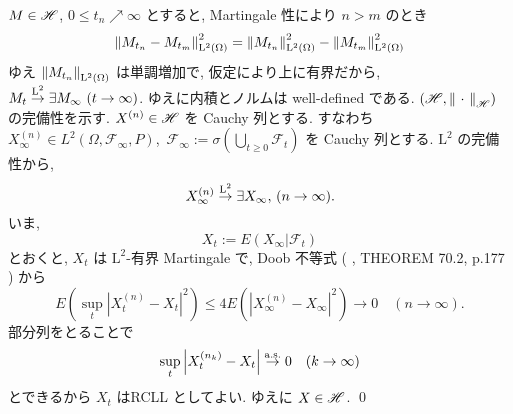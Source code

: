 \documentclass{ltjsarticle}
\begin{document}
\begin{prf}
	\( M \in \mathscr{H} \), \( 0 \le t_n \nearrow \infty \) とすると, Martingale 性により \( n > m \) のとき
	\[
		\left\|  M_{t_n} - M_{t_m}  \right\|_{\mathrm{L}^2(\Omega)}^2 = \left\|  M_{t_n}  \right\|_{\mathrm{L}^2(\Omega)}^2 - \left\|  M_{t_m}  \right\|_{\mathrm{L}^2(\Omega)}^2
	\]
	ゆえ \( \left\|  M_{t_n}  \right\|_{\mathrm{L}^2(\Omega)} \) は単調増加で, 仮定により上に有界だから,
	\( M_t \stackrel{ \mathrm{L}^2 }{ \to } \exists M_{\infty} \ (t \to \infty) \).
	ゆえに内積とノルムは well-defined である.
	\( \left( \mathscr{H}, \left\| \ \cdot \  \right\|_{\mathscr{H}} \right) \) の完備性を示す.
	\( X^{ ( n ) } \in \mathscr{H} \) を Cauchy 列とする.
	すなわち
	\( X^{ ( n ) }_{\infty} \in L^2( \Omega, \mathscr{F}_{\infty}, P ) \),\,
	\( \mathscr{F}_{\infty} := \sigma \left( \bigcup_{ t \ge 0} \mathscr{F}_t \right) \)
	を Cauchy 列とする.
	\( \mathrm{L}^2 \) の完備性から,
	\[
		X^{ ( n ) }_{\infty} \stackrel{ \mathrm{L}^2 }{ \to } \exists X_{\infty},\,( n \to \infty ).
	\]
	いま,
	\[
		X_t := E \left( X_{\infty} | \mathscr{F}_t \right)
	\]
	とおくと, \( X_t \) は \( \mathrm{L}^2 \)-有界 Martingale で,
	Doob 不等式 ( \cite{Rogers-Williams:dmm1}, THEOREM 70.2, p.177 ) から
	\[
		E \left( \sup_t \left| X_t^{ ( n ) } - X_t \right|^2 \right)
		\le
		4 E \left( \left| X_{ \infty }^{ ( n ) } - X_{\infty} \right|^2 \right) \to 0
		\quad ( n \to \infty).
	\]
	部分列をとることで
	\[
		\sup_t \left| X_t^{ ( n_k ) } - X_t \right|	\stackrel{ \mathrm{ a.s.} }{ \to } 0
		\quad ( k \to \infty )
	\]
	とできるから \( X_t \) はRCLL としてよい. ゆえに \( X \in \mathscr{H} \).
	\qed\end{prf}
\end{document}
